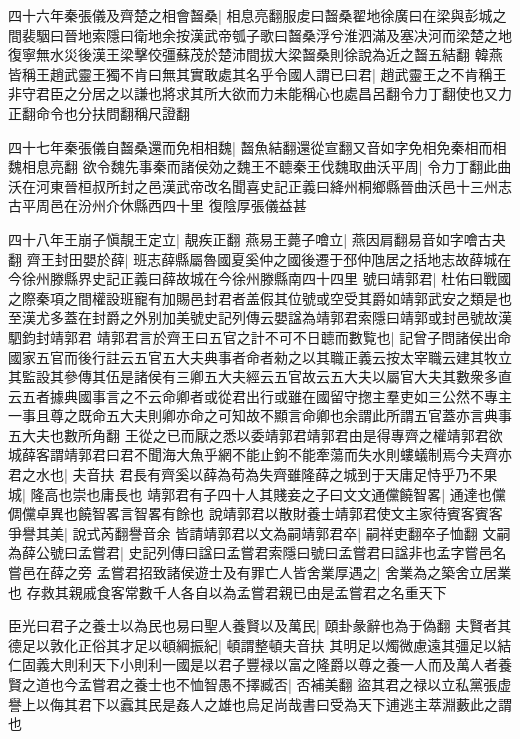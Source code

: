 四十六年秦張儀及齊楚之相會齧桑|{
	相息亮翻服䖍曰齧桑翟地徐廣曰在梁與彭城之間裴駰曰晉地索隱曰衛地余按漢武帝瓠子歌曰齧桑浮兮淮泗滿及塞决河而梁楚之地復寧無水災後漢王梁擊佼彊蘇茂於楚沛間拔大梁齧桑則徐說為近之齧五結翻}
韓燕皆稱王趙武靈王獨不肯曰無其實敢處其名乎令國人謂已曰君|{
	趙武靈王之不肯稱王非守君臣之分居之以謙也將求其所大欲而力未能稱心也處昌呂翻令力丁翻使也又力正翻命令也分扶問翻稱尺證翻}


四十七年秦張儀自齧桑還而免相相魏|{
	齧魚結翻還從宣翻又音如字免相免秦相而相魏相息亮翻}
欲令魏先事秦而諸侯効之魏王不聼秦王伐魏取曲沃平周|{
	令力丁翻此曲沃在河東晉桓叔所封之邑漢武帝改名聞喜史記正義曰絳州桐鄉縣晉曲沃邑十三州志古平周邑在汾州介休縣西四十里}
復陰厚張儀益甚

四十八年王崩子愼靚王定立|{
	靚疾正翻}
燕易王薨子噲立|{
	燕因肩翻易音如字噲古夬翻}
齊王封田嬰於薛|{
	班志薛縣屬魯國夏奚仲之國後遷于邳仲虺居之括地志故薛城在今徐州滕縣界史記正義曰薛故城在今徐州滕縣南四十四里}
號曰靖郭君|{
	杜佑曰戰國之際秦項之間權設班寵有加賜邑封君者盖假其位號或空受其爵如靖郭武安之類是也至漢尤多蓋在封爵之外别加美號史記列傳云嬰諡為靖郭君索隱曰靖郭或封邑號故漢駟鈞封靖郭君}
靖郭君言於齊王曰五官之計不可不日聼而數覧也|{
	記曾子問諸侯出命國家五官而後行註云五官五大夫典事者命者勑之以其職正義云按太宰職云建其牧立其監設其參傳其伍是諸侯有三卿五大夫經云五官故云五大夫以屬官大夫其數衆多直云五者據典國事言之不云命卿者或從君出行或雖在國留守揔主羣吏如三公然不專主一事且尊之既命五大夫則卿亦命之可知故不顯言命卿也余謂此所謂五官蓋亦言典事五大夫也數所角翻}
王從之已而厭之悉以委靖郭君靖郭君由是得專齊之權靖郭君欲城薛客謂靖郭君曰君不聞海大魚乎網不能止鉤不能牽蕩而失水則螻蟻制焉今夫齊亦君之水也|{
	夫音扶}
君長有齊奚以薛為苟為失齊雖隆薛之城到于天庸足恃乎乃不果城|{
	隆高也崇也庸長也}
靖郭君有子四十人其賤妾之子曰文文通儻饒智畧|{
	通達也儻倜儻卓異也饒智畧言智畧有餘也}
說靖郭君以散財養士靖郭君使文主家待賓客賓客爭譽其美|{
	說式芮翻譽音余}
皆請靖郭君以文為嗣靖郭君卒|{
	嗣祥吏翻卒子恤翻}
文嗣為薛公號曰孟嘗君|{
	史記列傳曰諡曰孟嘗君索隱曰號曰孟嘗君曰諡非也孟字嘗邑名嘗邑在薛之旁}
孟嘗君招致諸侯遊士及有罪亡人皆舍業厚遇之|{
	舍業為之築舍立居業也}
存救其親戚食客常數千人各自以為孟嘗君親已由是孟嘗君之名重天下

臣光曰君子之養士以為民也易曰聖人養賢以及萬民|{
	頤卦彖辭也為于偽翻}
夫賢者其德足以敦化正俗其才足以頓綱振紀|{
	頓謂整頓夫音扶}
其明足以燭微慮遠其彊足以結仁固義大則利天下小則利一國是以君子豐禄以富之隆爵以尊之養一人而及萬人者養賢之道也今孟嘗君之養士也不恤智愚不擇臧否|{
	否補美翻}
盜其君之禄以立私黨張虚譽上以侮其君下以蠧其民是姦人之雄也烏足尚哉書曰受為天下逋逃主萃淵藪此之謂也

